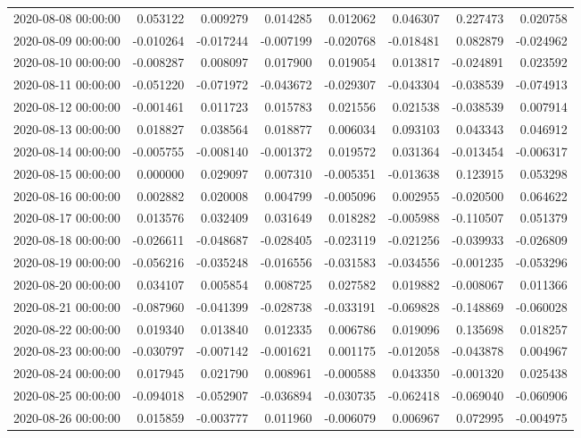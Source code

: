 \begin{tabular}{lrrrrrrr}
2020-08-08 00:00:00 & 0.053122 & 0.009279 & 0.014285 & 0.012062 & 0.046307 & 0.227473 & 0.020758 \\
2020-08-09 00:00:00 & -0.010264 & -0.017244 & -0.007199 & -0.020768 & -0.018481 & 0.082879 & -0.024962 \\
2020-08-10 00:00:00 & -0.008287 & 0.008097 & 0.017900 & 0.019054 & 0.013817 & -0.024891 & 0.023592 \\
2020-08-11 00:00:00 & -0.051220 & -0.071972 & -0.043672 & -0.029307 & -0.043304 & -0.038539 & -0.074913 \\
2020-08-12 00:00:00 & -0.001461 & 0.011723 & 0.015783 & 0.021556 & 0.021538 & -0.038539 & 0.007914 \\
2020-08-13 00:00:00 & 0.018827 & 0.038564 & 0.018877 & 0.006034 & 0.093103 & 0.043343 & 0.046912 \\
2020-08-14 00:00:00 & -0.005755 & -0.008140 & -0.001372 & 0.019572 & 0.031364 & -0.013454 & -0.006317 \\
2020-08-15 00:00:00 & 0.000000 & 0.029097 & 0.007310 & -0.005351 & -0.013638 & 0.123915 & 0.053298 \\
2020-08-16 00:00:00 & 0.002882 & 0.020008 & 0.004799 & -0.005096 & 0.002955 & -0.020500 & 0.064622 \\
2020-08-17 00:00:00 & 0.013576 & 0.032409 & 0.031649 & 0.018282 & -0.005988 & -0.110507 & 0.051379 \\
2020-08-18 00:00:00 & -0.026611 & -0.048687 & -0.028405 & -0.023119 & -0.021256 & -0.039933 & -0.026809 \\
2020-08-19 00:00:00 & -0.056216 & -0.035248 & -0.016556 & -0.031583 & -0.034556 & -0.001235 & -0.053296 \\
2020-08-20 00:00:00 & 0.034107 & 0.005854 & 0.008725 & 0.027582 & 0.019882 & -0.008067 & 0.011366 \\
2020-08-21 00:00:00 & -0.087960 & -0.041399 & -0.028738 & -0.033191 & -0.069828 & -0.148869 & -0.060028 \\
2020-08-22 00:00:00 & 0.019340 & 0.013840 & 0.012335 & 0.006786 & 0.019096 & 0.135698 & 0.018257 \\
2020-08-23 00:00:00 & -0.030797 & -0.007142 & -0.001621 & 0.001175 & -0.012058 & -0.043878 & 0.004967 \\
2020-08-24 00:00:00 & 0.017945 & 0.021790 & 0.008961 & -0.000588 & 0.043350 & -0.001320 & 0.025438 \\
2020-08-25 00:00:00 & -0.094018 & -0.052907 & -0.036894 & -0.030735 & -0.062418 & -0.069040 & -0.060906 \\
2020-08-26 00:00:00 & 0.015859 & -0.003777 & 0.011960 & -0.006079 & 0.006967 & 0.072995 & -0.004975 \\

\end{tabular}

